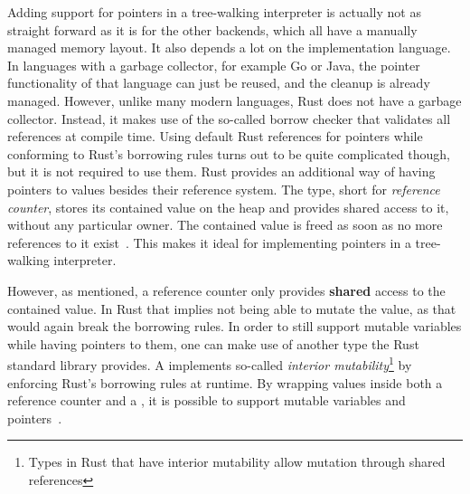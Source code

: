Adding support for pointers in a tree-walking interpreter is actually not as straight forward as it is for the other backends, which all have a manually managed memory layout.
It also depends a lot on the implementation language.
In languages with a garbage collector, for example Go or Java, the pointer functionality of that language can just be reused, and the cleanup is already managed.
However, unlike many modern languages, Rust does not have a garbage collector.
Instead, it makes use of the so-called borrow checker that validates all references at compile time.
Using default Rust references for pointers while conforming to Rust's borrowing rules turns out to be quite complicated though, but it is not required to use them.
Rust provides an additional way of having pointers to values besides their reference system.
The  type, short for \emph{reference counter}, stores its contained value on the heap and provides shared access to it, without any particular owner.
The contained value is freed as soon as no more references to it exist~\cite[pp.~131--133]{McNamara2021-hz}.
This makes it ideal for implementing pointers in a tree-walking interpreter.

However, as mentioned, a reference counter only provides \textbf{shared} access to the contained value.
In Rust that implies not being able to mutate the value, as that would again break the borrowing rules.
In order to still support mutable variables while having pointers to them, one can make use of another type the Rust standard library provides.
A  implements so-called \emph{interior mutability}\footnote{Types in Rust that have interior mutability allow mutation through shared references} by enforcing Rust's borrowing rules at runtime.
By wrapping values inside both a reference counter and a , it is possible to support mutable variables and pointers~\cite[pp.~131--133]{McNamara2021-hz}.
